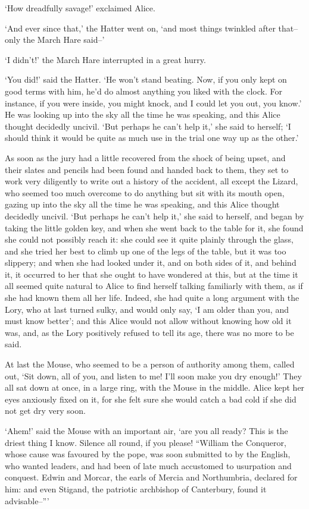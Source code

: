 \documentclass[statementpaper,twoside,openany]{memoir}
\begin{document}
`How dreadfully savage!' exclaimed Alice.

`And ever since that,' the Hatter went on, `and most things twinkled after that--only the March Hare said--'

`I didn't!' the March Hare interrupted in a great hurry.

`You did!' said the Hatter. `He won't stand beating. Now, if you only kept on good terms with him, he'd do almost anything you liked with the clock. For instance, if you were inside, you might knock, and I could let you out, you know.' He was looking up into the sky all the time he was speaking, and this Alice thought decidedly uncivil. `But perhaps he can't help it,' she said to herself; `I should think it would be quite as much use in the trial one way up as the other.'

As soon as the jury had a little recovered from the shock of being upset, and their slates and pencils had been found and handed back to them, they set to work very diligently to write out a history of the accident, all except the Lizard, who seemed too much overcome to do anything but sit with its mouth open, gazing up into the sky all the time he was speaking, and this Alice thought decidedly uncivil. `But perhaps he can't help it,' she said to herself, and began by taking the little golden key, and when she went back to the table for it, she found she could not possibly reach it: she could see it quite plainly through the glass, and she tried her best to climb up one of the legs of the table, but it was too slippery; and when she had looked under it, and on both sides of it, and behind it, it occurred to her that she ought to have wondered at this, but at the time it all seemed quite natural to Alice to find herself talking familiarly with them, as if she had known them all her life. Indeed, she had quite a long argument with the Lory, who at last turned sulky, and would only say, `I am older than you, and must know better'; and this Alice would not allow without knowing how old it was, and, as the Lory positively refused to tell its age, there was no more to be said.

At last the Mouse, who seemed to be a person of authority among them, called out, `Sit down, all of you, and listen to me! I'll soon make you dry enough!' They all sat down at once, in a large ring, with the Mouse in the middle. Alice kept her eyes anxiously fixed on it, for she felt sure she would catch a bad cold if she did not get dry very soon.

`Ahem!' said the Mouse with an important air, `are you all ready? This is the driest thing I know. Silence all round, if you please! ``William the Conqueror, whose cause was favoured by the pope, was soon submitted to by the English, who wanted leaders, and had been of late much accustomed to usurpation and conquest. Edwin and Morcar, the earls of Mercia and Northumbria, declared for him: and even Stigand, the patriotic archbishop of Canterbury, found it advisable--'''
\end{document}
